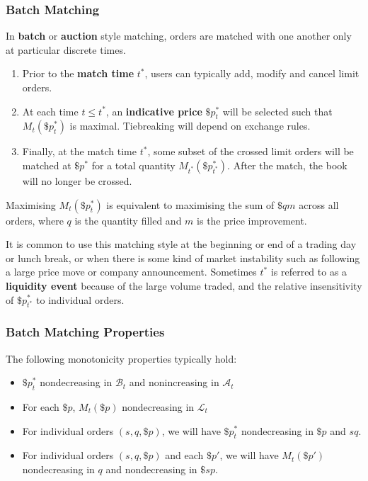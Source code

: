 \documentclass{article}
\begin{document}
\subsubsection{Batch Matching}
In \textbf{batch} or \textbf{auction} style matching, orders are matched with one another only at particular discrete times.

\begin{enumerate}
	\item Prior to the \textbf{match time} $t^*$, users can typically add, modify and cancel limit orders.
	\item At each time $t\leq t^*$, an \textbf{indicative price} $\$p^*_t$ will be selected such that $M_t(\$p^*_t)$ is maximal. Tiebreaking will depend on exchange rules.
	\item Finally, at the match time $t^*$, some subset of the crossed limit orders will be matched at $\$p^*$ for a total quantity $M_{t^*}(\$p^*_{t^*})$. After the match, the book will no longer be crossed.
\end{enumerate}

Maximising $M_t(\$p^*_t)$ is equivalent to maximising the sum of $\$qm$ across all orders, where $q$ is the quantity filled and $m$ is the price improvement.%

It is common to use this matching style at the beginning or end of a trading day or lunch break, or when there is some kind of market instability such as following a large price move or company announcement. Sometimes $t^*$ is referred to as a \textbf{liquidity event} because of the large volume traded, and the relative insensitivity of $\$p^*_{t^*}$ to individual orders.%

\subsubsection{Batch Matching Properties}
The following monotonicity properties typically hold:
\begin{itemize}
	\item $\$p^*_t$ nondecreasing in $\mathcal{B}_t$ and nonincreasing in $\mathcal{A}_t$
	\item For each $\$p$, $M_t(\$p)$ nondecreasing in $\mathcal{L}_t$
	\item For individual orders $(s,q,\$p)$, we will have $\$p^*_t$ nondecreasing in $\$p$ and $sq$. %
	\item For individual orders $(s,q,\$p)$ and each $\$p'$, we will have $M_t(\$p')$ nondecreasing in $q$ and nondecreasing in $\$sp$.
\end{itemize}
\end{document}
